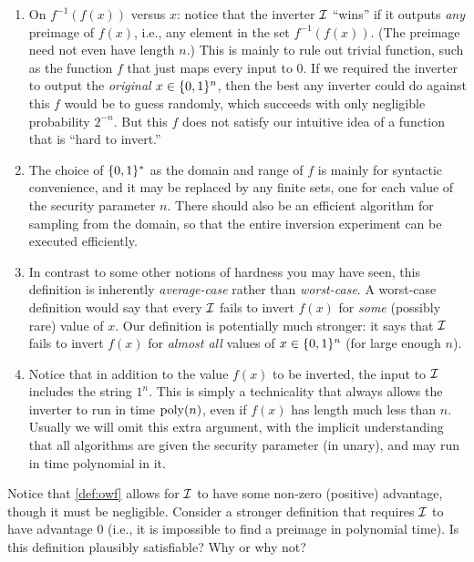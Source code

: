 \documentclass[11pt]{article}
\begin{document}
\begin{enumerate}
\item On $f^{-1}(f(x))$ versus $x$: notice that the inverter $\mathcal{I}$
  ``wins'' if it outputs \emph{any} preimage of $f(x)$, i.e., any
  element in the set $f^{-1}(f(x))$.  (The preimage need not even have
  length $n$.)  This is mainly to rule out trivial function, such as
  the function $f$ that just maps every input to $0$.  If we required
  the inverter to output the \emph{original} $x \in \{0,1\}^{n}$, then
  the best any inverter could do against this $f$ would be to guess
  randomly, which succeeds with only negligible probability $2^{-n}$.
  But this $f$ does not satisfy our intuitive idea of a function that
  is ``hard to invert.''
  
\item The choice of $\{0,1\}^{*}$ as the domain and range of $f$ is
  mainly for syntactic convenience, and it may be replaced by any
  finite sets, one for each value of the security parameter $n$.
  There should also be an efficient algorithm for sampling from the
  domain, so that the entire inversion experiment can be executed
  efficiently.

\item In contrast to some other notions of hardness you may have seen,
  this definition is inherently \emph{average-case} rather than
  \emph{worst-case}.  A worst-case definition would say that every
  $\mathcal{I}$ fails to invert $f(x)$ for \emph{some} (possibly rare) value
  of $x$.  Our definition is potentially much stronger: it says that
  $\mathcal{I}$ fails to invert $f(x)$ for \emph{almost all} values of $x \in
  \{0,1\}^{n}$ (for large enough $n$).\label{item:worst-average}
  
\item Notice that in addition to the value $f(x)$ to be inverted, the
  input to $\mathcal{I}$ includes the string $1^{n}$.  This is simply a
  technicality that always allows the inverter to run in time
  $\operatorname{poly}(n)$, even if $f(x)$ has length much less than $n$.  Usually
  we will omit this extra argument, with the implicit understanding
  that all algorithms are given the security parameter (in unary), and
  may run in time polynomial in it.
\end{enumerate}

\begin{question}
  Notice that \cref{def:owf} allows for \(\mathcal{I}\) to have
  some non-zero (positive) advantage, though it must be
  negligible. Consider a stronger definition that requires \(\mathcal{I}\) to
  have advantage 0 (i.e., it is impossible to find a preimage in
  polynomial time). Is this definition plausibly satisfiable?  Why or
  why not?
\end{question}
  
\end{document}
